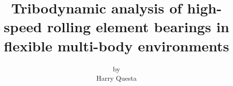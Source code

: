 




\title{Tribodynamic analysis of high-speed rolling element bearings in flexible multi-body environments}


\author{by \\ Harry Questa}









     

